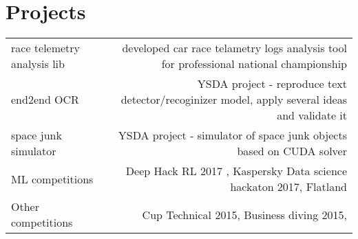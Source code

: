 \section*{Projects}
\vspace{-0.5em}
\begin{tabular}{@{}L!{\VRule}R}
    race telemetry analysis lib & developed car race telametry logs analysis tool for professional national championship        \\
    end2end OCR                 & YSDA project - reproduce text detector/recoginizer model, apply several ideas and validate it \\
    space junk simulator        & YSDA project - simulator of space junk objects based on CUDA solver                           \\
    ML competitions             & Deep Hack RL 2017 , Kaspersky Data science hackaton 2017, Flatland                            \\
    Other competitions          & Cup Technical 2015, Business diving 2015,
\end{tabular}